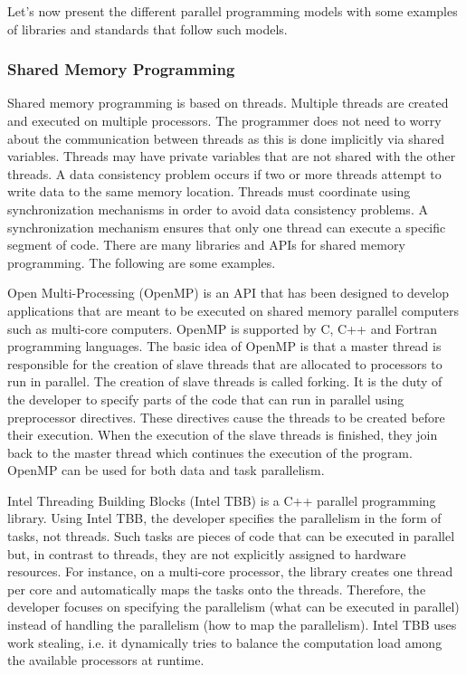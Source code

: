Let's now present the different parallel programming models with some examples of libraries and standards that follow such models.

\subsubsection{Shared Memory Programming}

Shared memory programming is based on threads. Multiple threads are created and executed on multiple processors. The programmer does not need to worry about the communication between threads as this is done implicitly via shared variables. Threads may have private variables that are not shared with the other threads. A data consistency problem occurs if two or more threads attempt to write data to the same memory location. Threads must coordinate using synchronization mechanisms in order to avoid data consistency problems. A synchronization mechanism ensures that only one thread can execute a specific segment of code. There are many libraries and APIs for shared memory programming. The following are some examples.

Open Multi-Processing (OpenMP) \cite{openmp} is an API that has been designed to develop applications that are meant to be executed on shared memory parallel computers such as multi-core computers. OpenMP is supported by C, C++ and Fortran programming languages. The basic idea of OpenMP is that a master thread is responsible for the creation of slave threads that are allocated to processors to run in parallel. The creation of slave threads is called forking. It is the duty of the developer to specify parts of the code that can run in parallel using preprocessor directives. These directives cause the threads to be created before their execution. When the execution of the slave threads is finished, they join back to the master thread which continues the execution of the program. OpenMP can be used for both data and task parallelism.

Intel Threading Building Blocks (Intel TBB) \cite{reinders:2007} is a C++ parallel programming library. Using Intel TBB, the developer specifies the parallelism in the form of tasks, not threads. Such tasks are pieces of code that can be executed in parallel but, in contrast to threads, they are not explicitly assigned to hardware resources. For instance, on a multi-core processor, the library creates one thread per core and automatically maps the tasks onto the threads. Therefore, the developer focuses on specifying the parallelism (what can be executed in parallel) instead of handling the parallelism (how to map the parallelism). Intel TBB uses work stealing, i.e. it dynamically tries to balance the computation load among the available processors at runtime.

